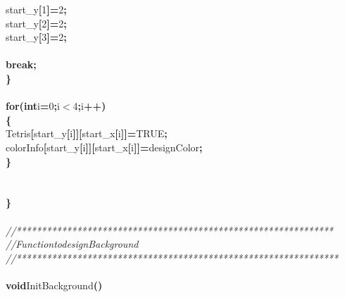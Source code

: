 \documentclass[a4paper, 10pt]{article}
\newcommand\SPC{\hspace*{0.6em}}
\newcommand{\CppAComment}[1]{\textit{\textcolor[rgb]{0.2,0.6,1}{#1}}}
\newcommand{\CppAIdentifier}[1]{#1}
\newcommand{\CppANumber}[1]{\textcolor[rgb]{0.5,0,0.5}{#1}}
\newcommand{\CppAReservedWord}[1]{\textbf{#1}}
\newcommand{\CppASpace}[1]{\colorbox[rgb]{1,1,1}{#1}}
\newcommand{\CppASymbol}[1]{\textbf{\textcolor[rgb]{1,0,0}{#1}}}
\begin{document}
\begin{ttfamily}
\CppASpace{\SPC \SPC }\CppAIdentifier{start\_y}\CppASymbol{[}\CppANumber{1}\CppASymbol{]}\CppASymbol{=}\CppANumber{2}\CppASymbol{;}\\
\CppASpace{\SPC \SPC }\CppAIdentifier{start\_y}\CppASymbol{[}\CppANumber{2}\CppASymbol{]}\CppASymbol{=}\CppANumber{2}\CppASymbol{;}\\
\CppASpace{\SPC \SPC }\CppAIdentifier{start\_y}\CppASymbol{[}\CppANumber{3}\CppASymbol{]}\CppASymbol{=}\CppANumber{2}\CppASymbol{;}\\
\\
\CppASpace{\SPC \SPC }\CppAReservedWord{break}\CppASymbol{;}\\
\CppASpace{\SPC }\CppASymbol{\}}\\
\\
\CppASpace{\SPC }\CppAReservedWord{for}\CppASymbol{(}\CppAReservedWord{int}\CppASpace{\SPC }\CppAIdentifier{i}\CppASymbol{=}\CppANumber{0}\CppASymbol{;}\CppAIdentifier{i}\CppASymbol{$<$}\CppANumber{4}\CppASymbol{;}\CppAIdentifier{i}\CppASymbol{++}\CppASymbol{)}\\
\CppASpace{\SPC }\CppASymbol{\{}\\
\CppASpace{\SPC \SPC }\CppAIdentifier{Tetris}\CppASymbol{[}\CppAIdentifier{start\_y}\CppASymbol{[}\CppAIdentifier{i}\CppASymbol{]}\CppASymbol{]}\CppASymbol{[}\CppAIdentifier{start\_x}\CppASymbol{[}\CppAIdentifier{i}\CppASymbol{]}\CppASymbol{]}\CppASymbol{=}\CppAIdentifier{TRUE}\CppASymbol{;}\\
\CppASpace{\SPC \SPC }\CppAIdentifier{colorInfo}\CppASymbol{[}\CppAIdentifier{start\_y}\CppASymbol{[}\CppAIdentifier{i}\CppASymbol{]}\CppASymbol{]}\CppASymbol{[}\CppAIdentifier{start\_x}\CppASymbol{[}\CppAIdentifier{i}\CppASymbol{]}\CppASymbol{]}\CppASymbol{=}\CppAIdentifier{designColor}\CppASymbol{;}\\
\CppASpace{\SPC }\CppASymbol{\}}\\
\\
\\
\CppASymbol{\}}\\
\\
\CppAComment{//***************************************************************}\\
\CppAComment{//\SPC \SPC \SPC \SPC \SPC \SPC \SPC \SPC \SPC \SPC \SPC Function\SPC to\SPC design\SPC Background}\\
\CppAComment{//****************************************************************}\\
\\
\CppAReservedWord{void}\CppASpace{\SPC }\CppAIdentifier{InitBackground}\CppASymbol{(}\CppASymbol{)}\\

\end{ttfamily}
\end{document}
